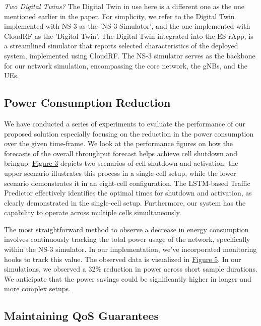 \textit{Two Digital Twins?} The Digital Twin in use here is a different one as the one mentioned earlier in the paper.
For simplicity, we refer to the Digital Twin implemented with NS-3 as the 'NS-3 Simulator', and the one implemented with CloudRF as the 'Digital Twin'.
The Digital Twin integrated into the ES rApp, is a streamlined simulator that reports selected characteristics of the deployed system, implemented using CloudRF.
The NS-3 simulator serves as the backbone for our network simulation, encompassing the core network, the gNBs, and the UEs. 

\subsection{Power Consumption Reduction}

We have conducted a series of experiments to evaluate the performance of our proposed solution especially focusing on the reduction in the power consumption over the given time-frame.
We look at the performance figures on how the forecasts of the overall throughput forecast helps achieve cell shutdown and bringup.
\hyperref[fig:r1]{Figure 3} depicts two scenarios of cell shutdown and activation: the upper scenario illustrates this process in a single-cell setup, while the lower scenario demonstrates it in an eight-cell configuration.
The LSTM-based Traffic Predictor effectively identifies the optimal times for shutdown and activation, as clearly demonstrated in the single-cell setup. 
Furthermore, our system has the capability to operate across multiple cells simultaneously.

The most straightforward method to observe a decrease in energy consumption involves continuously tracking the total power usage of the network, specifically within the NS-3 simulator.
In our implementation, we've incorporated monitoring hooks to track this value. 
The observed data is visualized in \hyperref[fig:r3]{Figure 5}.
In our simulations, we observed a 32\% reduction in power across short sample durations. 
We anticipate that the power savings could be significantly higher in longer and more complex setups.

\subsection{Maintaining QoS Guarantees}


